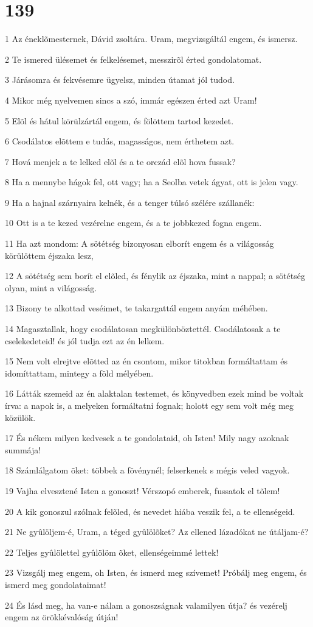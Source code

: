 \chapter{139}

\par 1 Az éneklõmesternek, Dávid zsoltára. Uram, megvizsgáltál engem, és ismersz.
\par 2 Te ismered ülésemet és felkelésemet, messzirõl érted gondolatomat.
\par 3 Járásomra és fekvésemre ügyelsz, minden útamat jól tudod.
\par 4 Mikor még nyelvemen sincs a szó, immár egészen érted azt Uram!
\par 5 Elõl és hátul körülzártál engem, és fölöttem tartod kezedet.
\par 6 Csodálatos elõttem e tudás, magasságos, nem érthetem azt.
\par 7 Hová menjek a te lelked elõl és a te orczád elõl hova fussak?
\par 8 Ha a mennybe hágok fel, ott vagy; ha a Seolba vetek ágyat, ott is jelen vagy.
\par 9 Ha a hajnal szárnyaira kelnék, és a tenger túlsó szélére szállanék:
\par 10 Ott is a te kezed vezérelne engem, és a te jobbkezed fogna engem.
\par 11 Ha azt mondom: A sötétség bizonyosan elborít engem és a világosság körülöttem éjszaka lesz,
\par 12 A sötétség sem borít el elõled, és fénylik az éjszaka, mint a nappal; a sötétség olyan, mint a világosság.
\par 13 Bizony te alkottad veséimet, te takargattál engem anyám méhében.
\par 14 Magasztallak, hogy csodálatosan megkülönböztettél. Csodálatosak a te cselekedeteid! és jól tudja ezt az én lelkem.
\par 15 Nem volt elrejtve elõtted az én csontom, mikor titokban formáltattam és idomíttattam, mintegy a föld mélyében.
\par 16 Látták szemeid az én alaktalan testemet, és könyvedben ezek mind be voltak írva: a napok is, a melyeken formáltatni fognak; holott egy sem volt még meg közülök.
\par 17 És nékem milyen kedvesek a te gondolataid, oh Isten! Mily nagy azoknak summája!
\par 18 Számlálgatom õket: többek a fövénynél; felserkenek s mégis veled vagyok.
\par 19 Vajha elvesztené Isten a gonoszt! Vérszopó emberek, fussatok el tõlem!
\par 20 A kik gonoszul szólnak felõled, és nevedet hiába veszik fel, a te ellenségeid.
\par 21 Ne gyûlöljem-é, Uram, a téged gyûlölõket? Az ellened lázadókat ne útáljam-é?
\par 22 Teljes gyûlölettel gyûlölöm õket, ellenségeimmé lettek!
\par 23 Vizsgálj meg engem, oh Isten, és ismerd meg szívemet! Próbálj meg engem, és ismerd meg gondolataimat!
\par 24 És lásd meg, ha van-e nálam a gonoszságnak valamilyen útja? és vezérelj engem az örökkévalóság útján!

